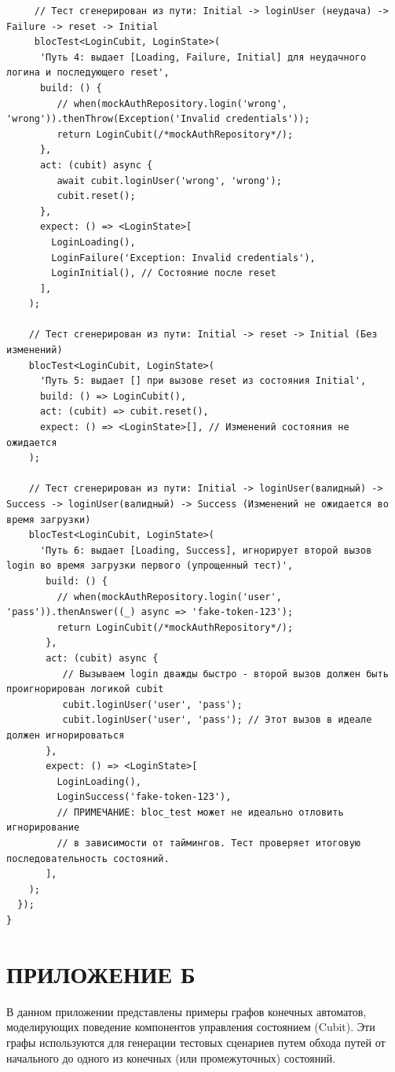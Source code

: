\documentclass[14pt, russian]{scrartcl}
\newcommand{\anonsection}[1]{\cleardoublepage
\phantomsection
\addcontentsline{toc}{section}{\protect\numberline{}#1}
\section*{#1}\vspace*{2.5ex} %
}
\begin{document}
\begin{verbatim}
     // Тест сгенерирован из пути: Initial -> loginUser (неудача) -> Failure -> reset -> Initial
     blocTest<LoginCubit, LoginState>(
      'Путь 4: выдает [Loading, Failure, Initial] для неудачного логина и последующего reset',
      build: () {
         // when(mockAuthRepository.login('wrong', 'wrong')).thenThrow(Exception('Invalid credentials'));
         return LoginCubit(/*mockAuthRepository*/);
      },
      act: (cubit) async {
         await cubit.loginUser('wrong', 'wrong');
         cubit.reset();
      },
      expect: () => <LoginState>[
        LoginLoading(),
        LoginFailure('Exception: Invalid credentials'),
        LoginInitial(), // Состояние после reset
      ],
    );

    // Тест сгенерирован из пути: Initial -> reset -> Initial (Без изменений)
    blocTest<LoginCubit, LoginState>(
      'Путь 5: выдает [] при вызове reset из состояния Initial',
      build: () => LoginCubit(),
      act: (cubit) => cubit.reset(),
      expect: () => <LoginState>[], // Изменений состояния не ожидается
    );

    // Тест сгенерирован из пути: Initial -> loginUser(валидный) -> Success -> loginUser(валидный) -> Success (Изменений не ожидается во время загрузки)
    blocTest<LoginCubit, LoginState>(
      'Путь 6: выдает [Loading, Success], игнорирует второй вызов login во время загрузки первого (упрощенный тест)',
       build: () {
         // when(mockAuthRepository.login('user', 'pass')).thenAnswer((_) async => 'fake-token-123');
         return LoginCubit(/*mockAuthRepository*/);
       },
       act: (cubit) async {
          // Вызываем login дважды быстро - второй вызов должен быть проигнорирован логикой cubit
          cubit.loginUser('user', 'pass');
          cubit.loginUser('user', 'pass'); // Этот вызов в идеале должен игнорироваться
       },
       expect: () => <LoginState>[
         LoginLoading(),
         LoginSuccess('fake-token-123'),
         // ПРИМЕЧАНИЕ: bloc_test может не идеально отловить игнорирование
         // в зависимости от таймингов. Тест проверяет итоговую последовательность состояний.
       ],
    );
  });
}
\end{verbatim}


\newpage
\anonsection{ПРИЛОЖЕНИЕ Б}

В данном приложении представлены примеры графов конечных автоматов, моделирующих поведение компонентов управления состоянием (Cubit). Эти графы используются для генерации тестовых сценариев путем обхода путей от начального до одного из конечных (или промежуточных) состояний.
\end{document}
